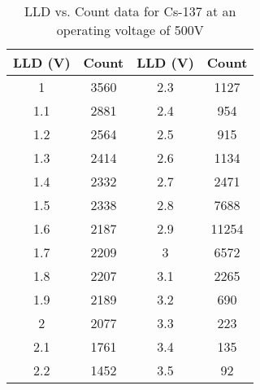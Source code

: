 \begin{table}[H]
    \centering
    \begin{tabular}{|c|c|c|c|}
    \hline
    LLD (V) & Count & LLD (V) & Count \\ \hline
    1 & 3560 & 2.3 & 1127 \\ \hline
    1.1 & 2881 & 2.4 & 954 \\ \hline
    1.2 & 2564 & 2.5 & 915 \\ \hline
    1.3 & 2414 & 2.6 & 1134 \\ \hline
    1.4 & 2332 & 2.7 & 2471 \\ \hline
    1.5 & 2338 & 2.8 & 7688 \\ \hline
    1.6 & 2187 & 2.9 & 11254 \\ \hline
    1.7 & 2209 & 3 & 6572 \\ \hline
    1.8 & 2207 & 3.1 & 2265 \\ \hline
    1.9 & 2189 & 3.2 & 690 \\ \hline
    2 & 2077 & 3.3 & 223 \\ \hline
    2.1 & 1761 & 3.4 & 135 \\ \hline
    2.2 & 1452 & 3.5 & 92 \\ \hline
    \end{tabular}
    \caption{LLD vs. Count data for Cs-137 at an operating voltage of 500V}
    \label{tab:cs137}
    \end{table}